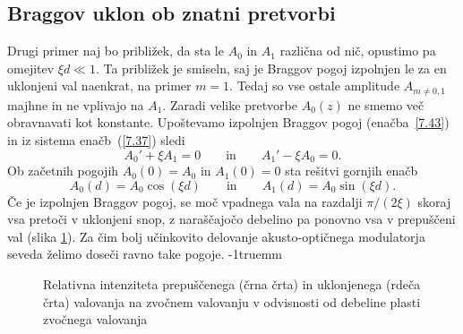 \subsection*{Braggov uklon ob znatni pretvorbi}
Drugi primer naj bo približek, da sta le $A_{0}$ in $A_{1}$ različna od nič, 
opustimo pa omejitev $\xi d\ll 1$. Ta približek je smiseln, saj je 
Braggov pogoj izpolnjen le za en uklonjeni val naenkrat, na
primer $m=1$. Tedaj so vse ostale amplitude $A_{m\ne0,1}$
majhne in ne vplivajo na $A_{1}$. Zaradi velike pretvorbe 
$A_{0}(z)$ ne smemo več obravnavati kot konstante. Upoštevamo 
izpolnjen Braggov pogoj (enačba~\ref{7.43}) in iz sistema enačb~(\ref{7.37})
sledi
\begin{equation}
A_{0}'+\xi A_{1}  =  0 \qquad \mathrm{in} \qquad A_{1}'-\xi A_{0} =  0.
\end{equation}
Ob začetnih pogojih $A_{0}(0)=A_{0}$ in $A_{1}(0)=0$ sta rešitvi gornjih enačb
\begin{equation}
A_{0}(d) = A_{0}\cos (\xi d) \qquad \mathrm{in} \qquad A_{1}(d) = A_{0}\sin (\xi d).
\end{equation}
Če je izpolnjen Braggov pogoj, se moč vpadnega vala na razdalji $\pi/(2\xi)$
skoraj vsa pretoči v uklonjeni snop, z naraščajočo debelino pa ponovno vsa v
prepuščeni val (slika \ref{s7.10}).
Za čim bolj učinkovito delovanje akusto-optičnega modulatorja seveda
želimo doseči ravno take pogoje.
\vglue-1truemm
\begin{figure}[h]
\centering
\def\svgwidth{80truemm} 

\caption{Relativna intenziteta prepuščenega (črna črta) in uklonjenega (rdeča črta) 
valovanja na zvočnem valovanju v odvisnosti od debeline plasti zvočnega valovanja}
\label{s7.10}
\end{figure}

